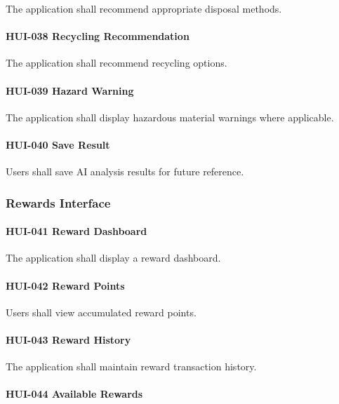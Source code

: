 The application shall recommend appropriate disposal methods.

\paragraph{HUI-038 Recycling Recommendation}

The application shall recommend recycling options.

\paragraph{HUI-039 Hazard Warning}

The application shall display hazardous material warnings where
applicable.

\paragraph{HUI-040 Save Result}

Users shall save AI analysis results for future reference.


\subsubsection*{Rewards Interface}

\paragraph{HUI-041 Reward Dashboard}

The application shall display a reward dashboard.

\paragraph{HUI-042 Reward Points}

Users shall view accumulated reward points.

\paragraph{HUI-043 Reward History}

The application shall maintain reward transaction history.

\paragraph{HUI-044 Available Rewards}

